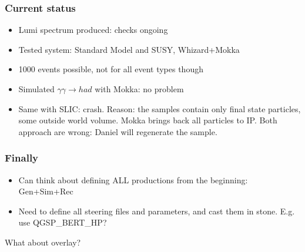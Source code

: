 \documentclass{beamer}
\begin{document}
\begin{frame}
\frametitle{Current status}
\begin{itemize}
  \item Lumi spectrum produced: checks ongoing
  \item Tested system: Standard Model and SUSY, Whizard+Mokka
  \item 1000 events possible, not for all event types though
  \item Simulated $\gamma\gamma \to had$ with Mokka: no problem
  \item Same with SLIC: crash. Reason: the samples contain only final state
  particles, some outside world volume. Mokka brings back all particles to IP.
  Both approach are wrong: Daniel will regenerate the sample. 
\end{itemize}
\end{frame}
\begin{frame}
\frametitle{Finally}
\begin{itemize}
  \item Can think about defining ALL productions from the beginning: Gen+Sim+Rec
  \item Need to define all steering files and parameters, and cast them in
  stone. E.g. use QGSP_BERT_HP?
\end{itemize}
\alert{What about overlay?}
\end{frame}
\end{document}

